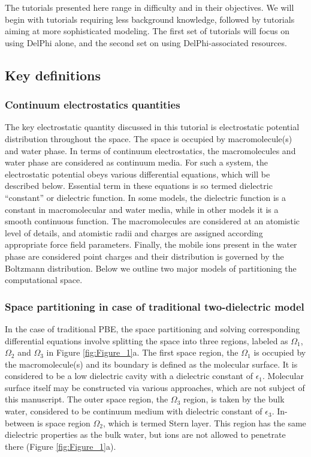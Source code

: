 \documentclass[9pt,tutorial,pubversion]{livecoms}
\begin{document}
The tutorials presented here range in difficulty and in their objectives. We will begin with tutorials requiring less background knowledge, followed by tutorials aiming at more sophisticated modeling. The first set of tutorials will focus on using DelPhi alone, and the second set on using DelPhi-associated resources.

\subsection{Key definitions}

\subsubsection{Continuum electrostatics quantities}
The key electrostatic quantity discussed in this tutorial is electrostatic potential distribution throughout the space. The space is occupied by macromolecule(s) and water phase. In terms of continuum electrostatics, the macromolecules and water phase are considered as continuum media. For such a system, the electrostatic potential obeys various differential equations, which will be described below. Essential term in these equations is so termed dielectric “constant” or dielectric function. In some models, the dielectric function is a constant in macromolecular and water media, while in other models it is a smooth continuous function. The macromolecules are considered at an atomistic level of details, and atomistic radii and charges are assigned according appropriate force field parameters. Finally, the mobile ions present in the water phase are considered point charges and their distribution is governed by the Boltzmann distribution. Below we outline two major models of partitioning the computational space. 

\subsubsection{Space partitioning in case of traditional two-dielectric model}
In the case of traditional PBE, the space partitioning and solving corresponding differential equations involve splitting the space into three regions, labeled as $ \Omega_1 $, $ \Omega_2 $ and $ \Omega_3 $ in Figure \ref{fig:Figure_1}a. The first space region, the $\Omega_1$ is occupied by the macromolecule(s) and its boundary is defined as the molecular surface. It is considered to be a low dielectric cavity with a dielectric constant of $\epsilon_1$. Molecular surface itself may be constructed via various approaches, which are not subject of this manuscript. The outer space region, the $\Omega_3$ region, is taken by the bulk water, considered to be continuum medium with dielectric constant of $\epsilon_3$. In-between is space region $\Omega_2$, which is termed Stern layer. This region has the same dielectric properties as the bulk water, but ions are not allowed to penetrate there (Figure \ref{fig:Figure_1}a).
\end{document}
